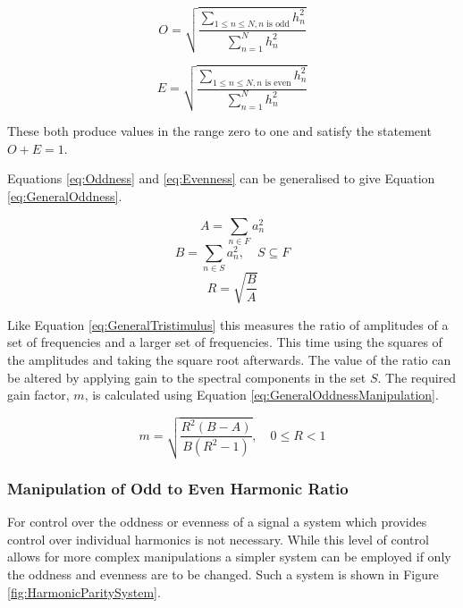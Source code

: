 		\begin{equation}
			O = \sqrt{\frac{\sum_{1 \leq n \leq N, n \textrm{ is odd}} h_{n}^{2}}
			               {\sum_{n = 1}^{N} h_{n}^{2}}}
			\label{eq:Oddness}
		\end{equation}

		\begin{equation}
			E = \sqrt{\frac{\sum_{1 \leq n \leq N, n \textrm{ is even}} h_{n}^{2}}
			               {\sum_{n = 1}^{N} h_{n}^{2}}}
			\label{eq:Evenness}
		\end{equation}

		These both produce values in the range zero to one and satisfy the statement $O + E = 1$. 

		Equations \ref{eq:Oddness} and \ref{eq:Evenness} can be generalised to give Equation
		\ref{eq:GeneralOddness}.

		\[ A = \sum_{n \in F} a_{n}^{2} \]
		\[ B = \sum_{n \in S} a_{n}^{2}, \quad S \subseteq F \]
		\begin{equation}
			R = \sqrt{\frac{B}{A}}
			\label{eq:GeneralOddness}
		\end{equation}

		Like Equation \ref{eq:GeneralTristimulus} this measures the ratio of amplitudes of a set of frequencies and
		a larger set of frequencies. This time using the squares of the amplitudes and taking the square root
		afterwards. The value of the ratio can be altered by applying gain to the spectral components in the set
		$S$. The required gain factor, $m$, is calculated using Equation \ref{eq:GeneralOddnessManipulation}.

		\begin{equation}
			m = \sqrt{\frac{R^{2}(B - A)}{B(R^{2} - 1)}}, \quad 0 \leq R < 1
			\label{eq:GeneralOddnessManipulation}
		\end{equation}

		\subsubsection*{Manipulation of Odd to Even Harmonic Ratio}
			For control over the oddness or evenness of a signal a system which provides control over
			individual harmonics is not necessary. While this level of control allows for more complex
			manipulations a simpler system can be employed if only the oddness and evenness are to be changed.
			Such a system is shown in Figure \ref{fig:HarmonicParitySystem}.

